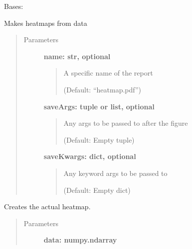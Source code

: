 \documentclass[letterpaper,10pt,english]{sphinxmanual}
\begin{document}
\begin{fulllineitems}
\label{fseq.reporting:fseq.reporting.reports.HeatMap}
Bases: {\hyperref[fseq.reporting:fseq.reporting.reports.ReportBase]{}}

Makes heatmaps from data
\begin{quote}\begin{description}
\item[{Parameters}] \leavevmode
\textbf{name: str, optional}
\begin{quote}

A specific name of the report

(Default: ``heatmap.pdf'')
\end{quote}

\textbf{saveArgs: tuple or list, optional}
\begin{quote}

Any args to be passed to  after the figure

(Default: Empty tuple)
\end{quote}

\textbf{saveKwargs: dict, optional}
\begin{quote}

Any keyword args to be passed to 

(Default: Empty dict)
\end{quote}

\end{description}\end{quote}

\begin{fulllineitems}
\label{fseq.reporting:fseq.reporting.reports.HeatMap.distill}
Creates the actual heatmap.
\begin{quote}\begin{description}
\item[{Parameters}] \leavevmode
\textbf{data: numpy.ndarray}
\begin{quote}


\end{quote}
\end{description}
\end{quote}
\end{fulllineitems}
\end{fulllineitems}
\end{document}
